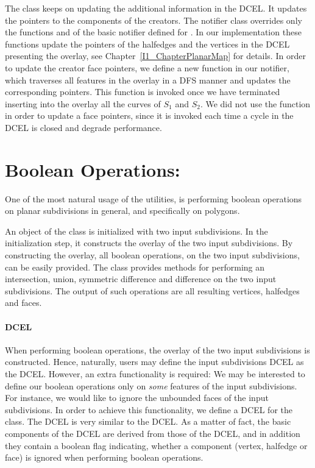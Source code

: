 \begin{ccTexOnly}
The  class 
keeps on updating the additional information in the DCEL.
It updates the pointers to the components of the creators.
The notifier class overrides only the functions  
and  of the basic notifier defined for .
In our implementation these functions update 
the pointers of the halfedges and the vertices in the DCEL 
presenting the overlay, see Chapter~\ref{I1_ChapterPlanarMap} for details.
In order to update the creator face pointers, we define a new function in our notifier, 
which traverses all features in the overlay in a DFS manner and updates the 
corresponding pointers. This function is invoked once we have terminated 
inserting into the overlay all the curves of $S_1$ and $S_2$.
We did not use the  function in order to update a face pointers, 
since it is invoked each time a cycle in the DCEL is closed and degrade performance. 

\section{Boolean Operations:}
One of the most natural usage of the  utilities, 
is performing boolean operations on planar subdivisions in general, 
and specifically on polygons.

An object of the  class is initialized with 
two input subdivisions. In the initialization step, it constructs the overlay 
of the two input subdivisions. By constructing the overlay, all boolean operations, 
on the two input subdivisions, can be easily provided.
The   class provides methods for 
performing an intersection, union, symmetric difference and difference on the two 
input subdivisions. The output of such operations are all resulting vertices, halfedges 
and faces.

\paragraph{DCEL}
When performing boolean operations, the overlay of the two input subdivisions is 
constructed. Hence, naturally, users may define the input subdivisions DCEL as the 
 DCEL. 
However, an extra functionality is required: We may be interested 
to define our boolean operations only on {\it some} features of the input subdivisions.
For instance, we would like to ignore the unbounded faces of the input subdivisions.
In order to achieve this functionality, we define a DCEL for the 
 class. 
The  DCEL is very similar to 
the  DCEL.
As a matter of fact, the basic components 
of the  DCEL are 
derived from those of the  DCEL, 
and in addition they contain a boolean flag indicating, 
whether a component (vertex, halfedge or face) is ignored 
when performing boolean operations.


\end{ccTexOnly}
